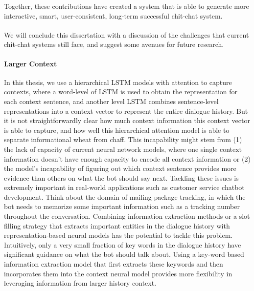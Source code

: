 Together, these contributions have created a system that is able to generate more interactive, smart, user-consistent,  
long-term successful chit-chat system. 
~\\~\\
We will conclude this dissertation with a discussion of
 the challenges that current chit-chat systems still face, and
suggest some avenues for
future research. 


\paragraph{Larger Context}
In this thesis, we use a hierarchical LSTM models with attention to capture contexts, where a word-level of LSTM is used to obtain the representation for each context sentence, and
another level  LSTM combines sentence-level representations into a context vector to represent the entire dialogue history. 
But
it is not
straightforwardly
 clear
how much context information this context vector is able to capture, and how well 
this hierarchical attention model is able to 
  separate informational 
wheat from chaff. This incapability might stem from (1) the lack of capacity of current neural network models, where 
one single context information 
doesn't  have enough capacity to 
 encode all context information or (2) the model's incapability of figuring out 
which context sentence provides more evidence 
than others
on what the bot should say next. 
Tackling these issues is extremely important in real-world applications such as  customer service chatbot development. Think about  the domain of mailing package tracking, 
in which
the bot needs to memorize some important information such as a tracking number throughout the conversation. 
Combining  information extraction methods
or a slot filling strategy 
 that extracts 
important entities in the dialogue history with representation-based neural models has the potential to tackle this problem.
Intuitively, only a very small fraction of key words in the dialogue history  have significant guidance on what the bot should talk about. Using a key-word based information extraction
model  that first extracts these keywords and then incorporates them into the context neural model provides more flexibility in leveraging information from larger history context.

